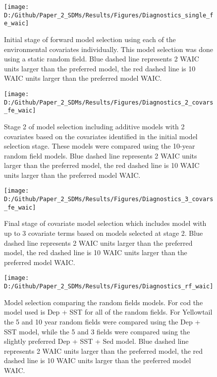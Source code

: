 \documentclass[
]{article}
\begin{document}
\newpage
\begin{landscape}
\begin{figure}
\texttt{[image: D:/Github/Paper\_2\_SDMs/Results/Figures/Diagnostics\_single\_fe\_waic]} \caption{Initial stage of forward model selection using each of the environmental covariates individually.  This model selection was done using a static random field. Blue dashed line represents 2 WAIC units larger than the preferred model, the red dashed line is 10 WAIC units larger than the preferred model WAIC. }\label{fig:diag-1-fe}
\end{figure}

\newpage
\begin{figure}
\texttt{[image: D:/Github/Paper\_2\_SDMs/Results/Figures/Diagnostics\_2\_covars\_fe\_waic]} \caption{Stage 2 of model selection including additive models with 2 covariates based on the covariates identified in the initial model selection stage. These models were compared using the 10-year random field models. Blue dashed line represents 2 WAIC units larger than the preferred model, the red dashed line is 10 WAIC units larger than the preferred model WAIC.}\label{fig:diag-2-fe}
\end{figure}

\newpage
\begin{figure}
\texttt{[image: D:/Github/Paper\_2\_SDMs/Results/Figures/Diagnostics\_3\_covars\_fe\_waic]} \caption{Final stage of covariate model selection which includes model with up to 3 covariate terms based on models selected at stage 2. Blue dashed line represents 2 WAIC units larger than the preferred model, the red dashed line is 10 WAIC units larger than the preferred model WAIC.}\label{fig:diag-3-fe}
\end{figure}

\newpage
\begin{figure}
\texttt{[image: D:/Github/Paper\_2\_SDMs/Results/Figures/Diagnostics\_rf\_waic]} \caption{Model selection comparing the random fields models.  For cod the model used is Dep + SST for all of the random fields.  For Yellowtail the 5 and 10 year random fields were compared using the Dep + SST model, while the 5 and 3 fields were compared using the slightly preferred Dep + SST + Sed model. Blue dashed line represents 2 WAIC units larger than the preferred model, the red dashed line is 10 WAIC units larger than the preferred model WAIC.}\label{fig:diag-rf}
\end{figure}
\end{landscape}
\end{document}
